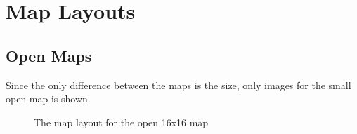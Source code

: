 \documentclass[runningheads]{llncs}
\begin{document}
\newpage
\appendix

\section{Map Layouts}

\subsection{Open Maps}
Since the only difference between the maps is the size, only images for the small open map is shown.
\begin{figure}[H]
\caption{The map layout for the open 16x16 map}
\end{figure}
\end{document}

